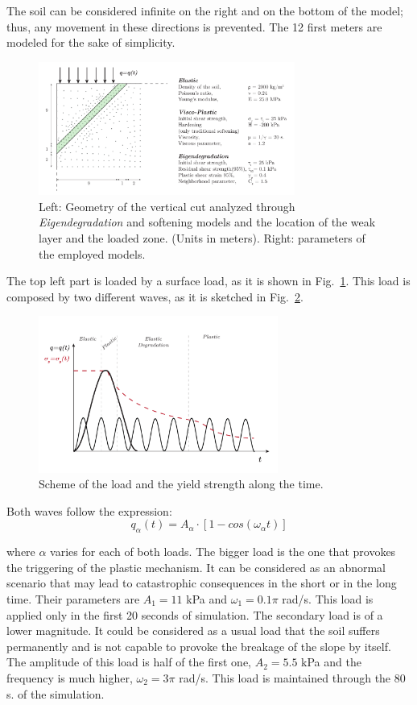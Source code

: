 \documentclass[applsci,journal,article,submit,moreauthors,pdftex]{Definitions/mdpi}
\begin{document}
The soil can be considered infinite on the right and on the bottom of the model; thus, any movement in these directions is prevented. The 12 first meters are modeled for the sake of simplicity.

\begin{figure}
\includegraphics[width=0.75\textwidth]{Figs/geo_VC.pdf}
\caption{Left: Geometry of the vertical cut analyzed through \emph{Eigendegradation} and softening models and the location of the weak layer and the loaded zone. (Units in meters). Right: parameters of the employed models.} 
\label{fig_VC1}
\end{figure}

The top left part is loaded by a surface load, as it is shown in Fig.~\ref{fig_VC1}. This load is composed by two different waves, as it is sketched in Fig.~\ref{fig_VC2}.

\begin{figure}
\includegraphics[width=0.7\textwidth]{Figs/carga_VC.pdf}
\caption{Scheme of the load and the yield strength along the time.}
\label{fig_VC2}
\end{figure}

Both waves follow the expression:
$$
q_\alpha(t)=A_{\alpha}\cdot\left[1-cos(\omega_{\alpha}t)\right]
$$

\noindent where $\alpha$ varies for each of both loads. The bigger load is the one that provokes the triggering of the plastic mechanism. It can be considered as an abnormal scenario that may lead to catastrophic consequences in the short or in the long time. Their parameters are $A_1=11$ kPa and $\omega_1=0.1\pi$ rad/s. This load is applied only in the first 20 seconds of simulation. The secondary load is of a lower magnitude. It could be considered as a usual load that the soil suffers permanently and is not capable to provoke the breakage of the slope by itself. The amplitude of this load is half of the first one, $A_2=5.5$ kPa and the frequency is much higher, $\omega_2=3\pi$ rad/s. This load is maintained through the 80 s. of the simulation.
\end{document}
